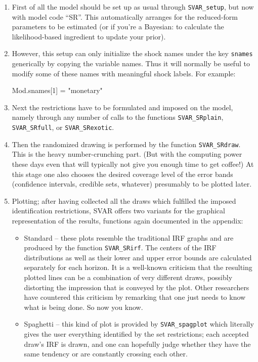 \documentclass[a4paper,10pt]{article}
\begin{document}
\begin{enumerate}
\item First of all the model should be set up as usual through \texttt{SVAR\_setup},
but now with model code ``SR''. This automatically arranges for the reduced-form
parameters to be estimated (or if you're a Bayesian: to calculate the likelihood-based
ingredient to update your prior).
\item However, this setup can only initialize the shock names under the key \texttt{snames}
generically by copying the variable names. Thus it will normally be useful 
to modify some of these names with meaningful shock labels. For example:
\begin{code}
Mod.snames[1] = "monetary"
\end{code}

\item Next the restrictions have to be formulated and imposed on the model, namely
through any number of calls to the functions \texttt{SVAR\_SRplain}, 
\texttt{SVAR\_SRfull}, or \texttt{SVAR\_SRexotic}. 


\item Then the randomized drawing is performed by the function 
\texttt{SVAR\_SRdraw}. This is the heavy number-crunching part. (But with the 
computing power these days even that will typically not give you enough time to 
get coffee!) At this stage one also chooses the desired coverage level of the error bands 
(confidence intervals, credible sets, whatever) presumably to be plotted later.

\item Plotting; after having collected all the draws which fulfilled the imposed identification 
 restrictions, SVAR offers two variants for the graphical representation of the results, 
 functions again documented in the appendix:
 \begin{itemize}
  \item Standard -- these plots resemble the traditional IRF graphs and are produced 
    by the function \texttt{SVAR\_SRirf}. The centers of the
    IRF distributions as well as their lower and upper error bounds are calculated 
    separately for each horizon. It is a well-known criticism that the resulting plotted
    lines can be a combination of very different draws, possibly distorting the impression 
    that is conveyed by the plot. Other researchers have countered this criticism by 
    remarking that one just needs to know what is being done. So now you know.
  \item Spaghetti -- this kind of plot is provided by \texttt{SVAR\_spagplot} which 
  literally gives the user everything identified by the 
  set restrictions; each accepted draw's IRF is drawn, and one can hopefully judge 
  whether they have the same tendency or are constantly crossing each other.
 \end{itemize}
 
 
\end{enumerate}
\end{document}
